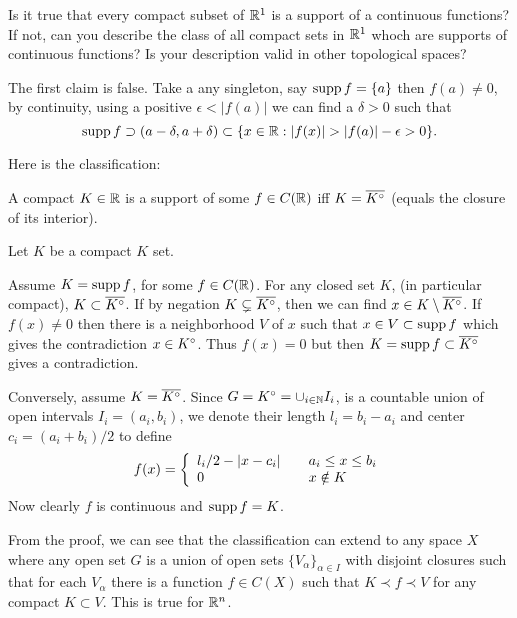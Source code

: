 \begin{enumerate}
\begin{excopy}
Is it true that every compact subset of \(\mathbb{R}^1\) is a support of a continuous
functions? If not, can you describe the class of all compact sets in
\(\mathbb{R}^1\) whoch are supports of continuous functions?
Is your description valid in other topological spaces?
\end{excopy}

The first claim is false. Take a any singleton, say \(\mathop{\rm supp}\nolimits f = \{a\}\)
then \(f(a) \neq 0\), by continuity, using a positive \(\epsilon < |f(a)|\)
we can find a \(\delta>0\) such that
\begin{equation*}
 \mathop{\rm supp}\nolimits f \supset (a-\delta, a + \delta)
         \subset \{x\in\mathbb{R}: |f(x)| > |f(a)| - \epsilon > 0\}.
\end{equation*}


Here is the classification:
\begin{llem}
A compact \(K\in\mathbb{R}\) is a support of some \(f\in C(\mathbb{R})\)
iff \(K = \overline{K^{\circ}}\) (equals the closure of its interior).
\end{llem}
\begin{thmproof}
Let $K$ be  a compact $K$ set.

Assume \(K = \mathop{\rm supp}\nolimits f\), for some \(f\in C(\mathbb{R})\).
For any closed set $K$, (in particular compact),
\(K \subset \overline{K^{\circ}}\).
If by negation \(K \subsetneq \overline{K^{\circ}}\), then we can find
\(x \in K \setminus \overline{K^{\circ}}\).
If \(f(x) \neq 0\) then there is a neighborhood $V$ of $x$
such that \(x\in V \subset \mathop{\rm supp}\nolimits f\) which gives the contradiction
\(x\in K^{\circ}\). Thus \(f(x) = 0\) but then
\(K = \mathop{\rm supp}\nolimits f \subset \overline{K^{\circ}}\) gives a contradiction.

Conversely, assume \(K = \overline{K^{\circ}}\).
Since \(G = K^{\circ} = \cup_{i\in\mathbb{N}} I_i\), is a countable union
of open  intervals \(I_i = (a_i, b_i)\), we denote their
length  \(l_i = b_i - a_i\) and
center
\(c_i = (a_i + b_i)/2\) to define
\begin{equation*}
f(x) = \left\{\begin{array}{l@{\qquad}l}
               l_i/2 - |x - c_i| &  a_i \leq x \leq b_i \\
               0 & x \notin K
              \end{array}\right.
\end{equation*}
Now clearly $f$ is continuous and \(\mathop{\rm supp}\nolimits f = K\).
\end{thmproof}

From the proof, we can see that the classification
can extend to any space $X$ where any open set $G$ is a union
of open sets \(\{V_\alpha\}_{\alpha\in I}\) with disjoint closures
such that for each \(V_\alpha\) there is a function \(f\in C(X)\)
such that \(K \prec f \prec V\) for any compact \(K\subset V\).
This is true for \(\mathbb{R}^n\).


\end{enumerate}
